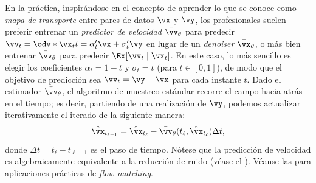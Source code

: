 \documentclass[../../book-main.tex]{subfiles}
\begin{document}
\begin{remark}
    En la práctica, inspirándose en el concepto de aprender lo que se conoce como
    \textit{mapa de transporte} entre pares de datos \(\vx\) y \(\vy\),
    los profesionales suelen preferir entrenar un \textit{predictor de velocidad}
    \(\bar{\vv}_{\theta}\) para predecir \(\vv_{t} = \odv*{\vx_{t}}{t} =
    \alpha_{t}^{\prime}\vx + \sigma_{t}^{\prime}\vy\) en lugar de un
    \textit{denoiser} \(\bar{\vx}_{\theta}\), o más bien entrenar
    \(\bar{\vv}_{\theta}\) para predecir \(\Ex[\vv_{t} \mid \vx_{t}]\).
    En este caso, lo más sencillo es elegir los coeficientes
    \(\alpha_{t} = 1 - t\) y
    \(\sigma_{t} = t\) (para \(t \in [0, 1]\)), de modo que el objetivo de predicción
    sea \(\vv_{t} = \vy - \vx\) para cada instante \(t\). Dado el
    estimador \(\bar{\vv}_{\theta}\), el algoritmo de muestreo estándar
    recorre el campo hacia atrás en el tiempo; es decir, partiendo de una
    realización de \(\vy\), podemos actualizar iterativamente el iterado de la siguiente manera:
    \begin{equation}
        \hat{\vx}_{t_{\ell - 1}} = \hat{\vx}_{t_{\ell}} -
        \bar{\vv}_{\theta}(t_{\ell}, \hat{\vx}_{t_{\ell}}) \Delta t,
    \end{equation}
    donde \(\Delta t = t_{\ell} - t_{\ell - 1}\) es el paso de tiempo.
    Nótese que la predicción de velocidad es algebraicamente equivalente a
    la reducción de ruido (véase el ). Véanse las
     para aplicaciones prácticas
    de \textit{flow matching}.
\end{remark}
\end{document}
